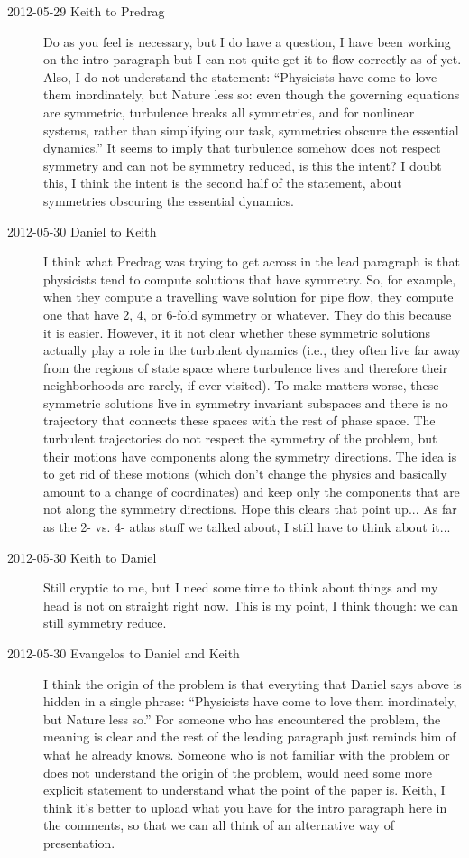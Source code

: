 \begin{description}
\item[2012-05-29 Keith to Predrag]  Do as you feel is necessary, but I do
have a question, I have been working on the intro paragraph but I can not
quite get it to flow correctly as of yet.  Also, I do not understand the
statement:
    ``Physicists have come to love them inordinately, but
Nature less so: even though the governing equations are symmetric,
turbulence breaks all symmetries, and for nonlinear systems, rather than
simplifying our task, symmetries obscure the essential dynamics.''
It seems to imply that turbulence somehow does not respect symmetry and
can not be symmetry reduced, is this the intent?  I doubt this, I think
the intent is the second half of the statement, about symmetries
obscuring the essential dynamics.

\item[2012-05-30 Daniel to Keith] I think what Predrag was trying to get
across in the lead paragraph is that physicists tend to compute solutions
that have symmetry. So, for example, when they compute a travelling wave
solution for pipe flow, they compute one that have 2, 4, or 6-fold
symmetry or whatever. They do this because it is easier. However, it it
not clear whether these symmetric solutions actually play a role in the
turbulent dynamics (i.e., they often live far away from the regions of
state space where turbulence lives and therefore their neighborhoods are
rarely, if ever visited). To make matters worse, these symmetric
solutions live in symmetry invariant subspaces and there is no trajectory
that connects these spaces with the rest of phase space.
	The turbulent trajectories do not respect the symmetry of the
problem, but their motions have components along the symmetry directions.
The idea is to get rid of these motions (which don't change the physics
and basically amount to a change of coordinates) and keep only the
components that are not along the symmetry directions. Hope this clears
that point up...
	As far as the 2- vs. 4- atlas stuff we talked about, I still have to think about it...

\item[2012-05-30 Keith to Daniel]  Still cryptic to me, but I need some time to think about things and my head is not on straight right now.  This is my point, I think though: we can still symmetry reduce.

\item[2012-05-30 Evangelos to Daniel and Keith] I think the origin of the problem is
that everyting that Daniel says above is hidden in a single phrase:
``Physicists have come to love them inordinately, but
Nature less so.'' For someone who has encountered the problem, the meaning is clear
and the rest of the leading paragraph just reminds him of what he already knows. Someone
who is not familiar with the problem or does not understand the origin of the problem,
would need some more explicit statement to understand what the point of the paper is.
Keith, I think it's better to upload what you have for the intro paragraph here in
the comments, so that we can all think of an alternative way of presentation.


\end{description}
